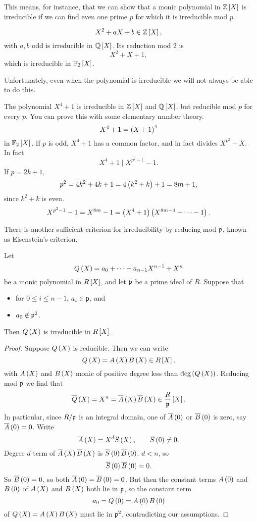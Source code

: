 This means, for instance, that we can show that a monic polynomial in $ \Z\sb{X} $ is irreducible if we can find even one prime $ p $ for which it is irreducible mod $ p $.

\begin{example*}
$$ X^2 + aX + b \in \Z\sb{X}, $$
with $ a, b $ odd is irreducible in $ \Q\sb{X} $. Its reduction mod $ 2 $ is
$$ X^2 + X + 1, $$
which is irreducible in $ \F_2\sb{X} $.
\end{example*}

Unfortunately, even when the polynomial is irreducible we will not always be able to do this.

\begin{example*}
The polynomial $ X^4 + 1 $ is irreducible in $ \Z\sb{X} $ and $ \Q\sb{X} $, but reducible mod $ p $ for every $ p $. You can prove this with some elementary number theory.
$$ X^4 + 1 = \rb{X + 1}^4 $$
in $ \F_2\sb{X} $. If $ p $ is odd, $ X^4 + 1 $ has a common factor, and in fact divides $ X^{p^2} - X $. In fact
$$ X^4 + 1 \mid X^{p^2 - 1} - 1. $$
If $ p = 2k + 1 $,
$$ p^2 = 4k^2 + 4k + 1 = 4\rb{k^2 + k} + 1 = 8m + 1, $$
since $ k^2 + k $ is even.
$$ X^{p^2 - 1} - 1 = X^{8m} - 1 = \rb{X^4 + 1}\rb{X^{8m - 4} - \dots - 1}. $$
\end{example*}

There is another sufficient criterion for irreducibility by reducing mod $ \pp $, known as Eisenstein's criterion.

\begin{proposition}
Let
$$ Q\rb{X} = a_0 + \dots + a_{n - 1}X^{n - 1} + X^n $$
be a monic polynomial in $ R\sb{X} $, and let $ \pp $ be a prime ideal of $ R $. Suppose that
\begin{itemize}
\item for $ 0 \le i \le n - 1 $, $ a_i \in \pp $, and
\item $ a_0 \notin \pp^2 $.
\end{itemize}
Then $ Q\rb{X} $ is irreducible in $ R\sb{X} $.
\end{proposition}

\begin{proof}
Suppose $ Q\rb{X} $ is reducible. Then we can write
$$ Q\rb{X} = A\rb{X}B\rb{X} \in R\sb{X}, $$
with $ A\rb{X} $ and $ B\rb{X} $ monic of positive degree less than $ \deg\rb{Q\rb{X}} $. Reducing mod $ \pp $ we find that
$$ \overline{Q}\rb{X} = X^n = \overline{A}\rb{X}\overline{B}\rb{X} \in \dfrac{R}{\pp}\sb{X}. $$
In particular, since $ R / \pp $ is an integral domain, one of $ \overline{A}\rb{0} $ or $ \overline{B}\rb{0} $ is zero, say $ \overline{A}\rb{0} = 0 $. Write
$$ \overline{A}\rb{X} = X^d\overline{S}\rb{X}, \qquad \overline{S}\rb{0} \ne 0. $$
Degree $ d $ term of $ \overline{A}\rb{X}\overline{B}\rb{X} $ is $ \overline{S}\rb{0}\overline{B}\rb{0} $. $ d < n $, so
$$ \overline{S}\rb{0}\overline{B}\rb{0} = 0. $$
So $ \overline{B}\rb{0} = 0 $, so both $ \overline{A}\rb{0} = \overline{B}\rb{0} = 0 $. But then the constant terms $ A\rb{0} $ and $ B\rb{0} $ of $ A\rb{X} $ and $ B\rb{X} $ both lie in $ \pp $, so the constant term
$$ a_0 = Q\rb{0} = A\rb{0}B\rb{0} $$
of $ Q\rb{X} = A\rb{X}B\rb{X} $ must lie in $ \pp^2 $, contradicting our assumptions.
\end{proof}

